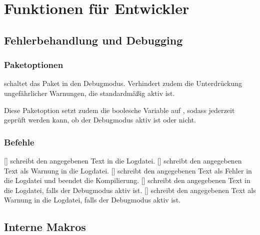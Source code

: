 \section{Funktionen für Entwickler}
	\subsection{Fehlerbehandlung und Debugging}
		\subsubsection{Paketoptionen}
			\begin{options}
				schaltet das Paket in den Debugmodus. Verhindert zudem
				die Unterdrückung ungefährlicher Warnungen, die
				standardmäßig aktiv ist.
				
				Diese Paketoption setzt zudem die boolesche Variable 
				 auf , sodass
				jederzeit geprüft werden kann, ob der Debugmodus aktiv
				ist oder nicht.
			\end{options}
		\subsubsection{Befehle}
			\begin{commands}
				[]
					schreibt den angegebenen Text in die Logdatei.
				[]
					schreibt den angegebenen Text als Warnung in die
					Logdatei.
				[]
					schreibt den angegebenen Text als Fehler in die
					Logdatei und beendet die Kompilierung.
				[]
					schreibt den angegebenen Text in die Logdatei,
					falls der Debugmodus aktiv ist.
				[]
					schreibt den angegebenen Text als Warnung in die
					Logdatei, falls der Debugmodus aktiv ist.
			\end{commands}
	
	\subsection{Interne Makros}
